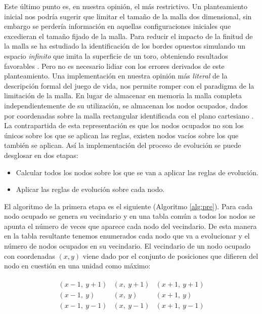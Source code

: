 \documentclass[../proyecto.tex]{memoir}
\begin{document}
Este último punto es, en nuestra opinión, el más restrictivo. Un planteamiento inicial nos podría sugerir que limitar el tamaño de la malla dos dimensional, sin embargo se perdería información en aquellas configuraciones iniciales que excedieran el tamaño fijado de la malla. Para reducir el impacto de la finitud de la malla se ha estudiado la identificación de los bordes opuestos simulando un espacio \textit{infinito} que imita la superficie de un toro, obteniendo resultados favorables \cite{finitudMalla, finitudMalla2}. Pero no es necesario lidiar con los errores derivados de este planteamiento. Una implementación en nuestra opinión más \textit{literal} de la descripción formal del juego de vida, nos permite romper con el paradigma de la limitación de la malla. En lugar de almacenar en memoria la malla completa independientemente de su utilización, se almacenan los nodos ocupados, dados por coordenadas sobre la malla rectangular identificada con el plano cartesiano \cite{boardless}. La contrapartida de esta representación es que los nodos ocupados no son los únicos sobre los que se aplican las reglas, existen nodos vacíos sobre los que también se aplican. Así la implementación del proceso de evolución se puede desglosar en dos etapas:

\begin{itemize}
\item Calcular todos los nodos sobre los que se van a aplicar las reglas de evolución.
\item Aplicar las reglas de evolución sobre cada nodo.
\end{itemize}

El algoritmo de la primera etapa es el siguiente (Algoritmo \ref{alg:pre}). Para cada nodo ocupado se genera su vecindario y en una tabla común a todos los nodos se apunta el número de veces que aparece cada nodo del vecindario. De esta manera en la tabla resultante tenemos enumerados cada nodo que va a evolucionar y el número de nodos ocupados en su vecindario. El vecindario de un nodo ocupado con coordenadas $(x,y)$ viene dado por el conjunto de posiciones que difieren del nodo en cuestión en una unidad como máximo:

\begin{align*}
\begin{array}{lcr}
(x-1,\ y+1) & (x,\ y+1) & (x+1,\ y+1)\\
(x-1,\ y) & (x,\ y) & (x+1,\ y)\\
(x-1,\ y-1) & (x,\ y-1) & (x+1,\ y-1)\\
\end{array} 
\end{align*}
\end{document}
